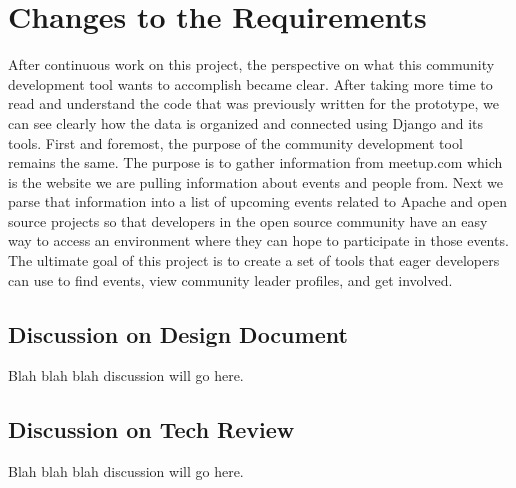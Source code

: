\documentclass[draftclsnofoot,10pt,onecolumn]{IEEEtran} %
\begin{document}


\section{Changes to the Requirements}
After continuous work on this project, the perspective on what
this community development tool wants to accomplish became clear. After taking
more time to read and understand the code that was previously written for the
prototype, we can see clearly how the data is organized and connected
using Django and its tools. First and foremost, the purpose of the community
development tool remains the same. The purpose is to gather information from
meetup.com which is the website we are pulling information about events and people from.
Next we parse that information into a list of upcoming events related to
Apache and open source projects so that developers in the open source community
have an easy way to access an environment where they can hope to participate in those
events. The ultimate goal of this project is to create a set of tools that eager developers
can use to find events, view community leader profiles, and get involved.




\subsection{Discussion on Design Document}
Blah blah blah discussion will go here.




\subsection{Discussion on Tech Review}
Blah blah blah discussion will go here.
\end{document}
